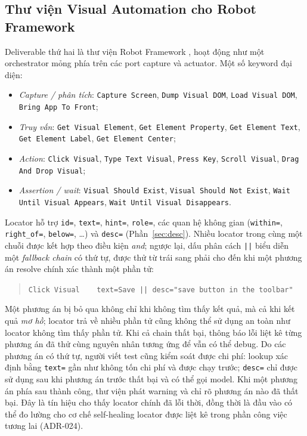 \documentclass[11pt,a4paper]{article}
\newcommand{\code}[1]{\texttt{#1}}
\begin{document}
\subsection{Thư viện Visual Automation cho Robot Framework}
Deliverable thứ hai là thư viện Robot Framework \cite{robotframework}, hoạt động
như một orchestrator mỏng phía trên các port capture và actuator. Một số keyword
đại diện:
\begin{itemize}[leftmargin=1.4em]
  \item \emph{Capture / phân tích}: \code{Capture Screen}, \code{Dump Visual DOM},
        \code{Load Visual DOM}, \code{Bring App To Front};
  \item \emph{Truy vấn}: \code{Get Visual Element}, \code{Get Element Property},
        \code{Get Element Text}, \code{Get Element Label}, \code{Get Element Center};
  \item \emph{Action}: \code{Click Visual}, \code{Type Text Visual},
        \code{Press Key}, \code{Scroll Visual}, \code{Drag And Drop Visual};
  \item \emph{Assertion / wait}: \code{Visual Should Exist},
        \code{Visual Should Not Exist}, \code{Wait Until Visual Appears},
        \code{Wait Until Visual Disappears}.
\end{itemize}
Locator hỗ trợ \code{id=}, \code{text=}, \code{hint=}, \code{role=}, các quan hệ không gian (\code{within=}, \code{right\_of=}, \code{below=}, \dots) và \code{desc=} (Phần~\ref{sec:desc}). Nhiều locator trong cùng một chuỗi được kết hợp theo điều kiện \emph{and}; ngược lại, dấu phân cách \code{||} biểu diễn một \emph{fallback chain} có thứ tự, được thử từ trái sang phải cho đến khi một phương án resolve chính xác thành một phần tử:

\begin{quote}\small
\code{Click Visual~~~~text=Save || desc="save button in the toolbar"}
\end{quote}

\noindent Một phương án bị bỏ qua không chỉ khi không tìm thấy kết quả, mà cả khi kết quả \emph{mơ hồ}; locator trả về nhiều phần tử cũng không thể sử dụng an toàn như locator không tìm thấy phần tử. Khi cả chain thất bại, thông báo lỗi liệt kê từng phương án đã thử cùng nguyên nhân tương ứng để vẫn có thể debug. Do các phương án có thứ tự, người viết test cũng kiểm soát được chi phí: lookup xác định bằng \code{text=} gần như không tốn chi phí và được chạy trước; \code{desc=} chỉ được sử dụng sau khi phương án trước thất bại và có thể gọi model. Khi một phương án phía sau thành công, thư viện phát warning và chỉ rõ phương án nào đã thất bại. Đây là tín hiệu cho thấy locator chính đã lỗi thời, đồng thời là đầu vào có thể đo lường cho cơ chế self-healing locator được liệt kê trong phần công việc tương lai (ADR-024).
\end{document}

